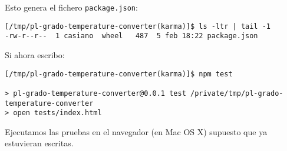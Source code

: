 Esto genera el fichero \verb|package.json|:
\begin{verbatim}
[/tmp/pl-grado-temperature-converter(karma)]$ ls -ltr | tail -1
-rw-r--r--  1 casiano  wheel   487  5 feb 18:22 package.json
\end{verbatim}
Si ahora escribo:
\begin{verbatim}
[/tmp/pl-grado-temperature-converter(karma)]$ npm test

> pl-grado-temperature-converter@0.0.1 test /private/tmp/pl-grado-temperature-converter
> open tests/index.html
\end{verbatim}
Ejecutamos las pruebas en el navegador (en Mac OS X) supuesto que ya estuvieran escritas.


